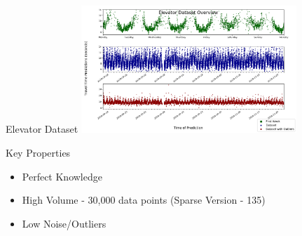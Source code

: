 \documentclass{beamer}
\begin{document}
\begin{frame}[t]{Elevator Dataset}
  \centering
  \vspace*{-0.33cm}
  {\includegraphics[width=3.2in]{images/data_overview/elevator_dataset_overview.png}}
  \vspace*{-0.20cm}

  \begin{block}{Key Properties}
    \begin{itemize}
      \item Perfect Knowledge
      \item High Volume - 30,000 data points (Sparse Version - 135)
      \item Low Noise/Outliers
    \end{itemize}
  \end{block}

\end{frame}
\end{document}
